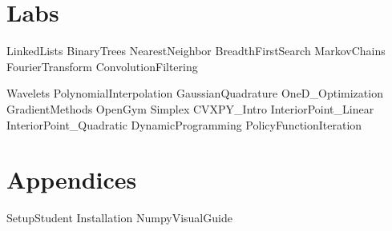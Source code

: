 \documentclass[opener-c,labs,red,nociteref]{HJnewsiambook}
\begin{document}
\part{Labs}
{LinkedLists}
{BinaryTrees}
{NearestNeighbor}
{BreadthFirstSearch}
{MarkovChains}
{FourierTransform}
{ConvolutionFiltering}

{Wavelets}
{PolynomialInterpolation}
{GaussianQuadrature}
{OneD_Optimization}
{GradientMethods}
{OpenGym}
{Simplex}
{CVXPY_Intro}
{InteriorPoint_Linear}
{InteriorPoint_Quadratic}
{DynamicProgramming}
{PolicyFunctionIteration}

\part{Appendices}
\begin{appendices}
{SetupStudent}
{Installation}
{NumpyVisualGuide}
\end{appendices}



\end{document}
